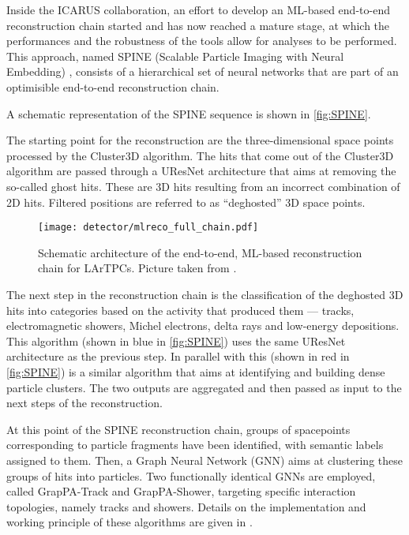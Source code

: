 Inside the ICARUS collaboration, an effort to develop an ML-based end-to-end reconstruction chain started and has now reached a mature stage, at which the performances and the robustness of the tools allow for analyses to be performed. This approach, named SPINE (Scalable Particle Imaging with Neural Embedding) \cite{Drielsma:2021jdv}, consists of a hierarchical set of neural networks that are part of an optimisible end-to-end reconstruction chain.

A schematic representation of the SPINE sequence is shown in \autoref{fig:SPINE}. 

The starting point for the reconstruction are the three-dimensional space points processed by the Cluster3D algorithm. The hits that come out of the Cluster3D algorithm are passed through a UResNet architecture that aims at removing the so-called ghost hits. These are 3D hits resulting from an incorrect combination of 2D hits. Filtered positions are referred to as ``deghosted'' 3D space points. 

\begin{figure}
    \centering
    \texttt{[image: detector/mlreco\_full\_chain.pdf]}
    \caption[SPINE end-to-end machine learning approach]{Schematic architecture of the end-to-end, ML-based reconstruction chain for LArTPCs. Picture taken from \cite{Drielsma:2021jdv}. }
    \label{fig:SPINE}
\end{figure}

The next step in the reconstruction chain is the classification of the deghosted 3D hits into categories based on the activity that produced them --- tracks, electromagnetic showers, Michel electrons, delta rays and low-energy depositions. This algorithm (shown in blue in \autoref{fig:SPINE}) uses the same UResNet architecture as the previous step. In parallel with this (shown in red in \autoref{fig:SPINE}) is a similar algorithm that aims at identifying and building dense particle clusters. The two outputs are aggregated and then passed as input to the next steps of the reconstruction. 


At this point of the SPINE reconstruction chain, groups of spacepoints corresponding to particle fragments have been identified, with semantic labels assigned to them. Then, a Graph Neural Network (GNN) aims at clustering these groups of hits into particles. Two functionally identical GNNs are employed, called GrapPA-Track and GrapPA-Shower, targeting specific interaction topologies, namely tracks and showers. Details on the implementation and working principle of these algorithms are given in \cite{Drielsma:2021jdv}. 

